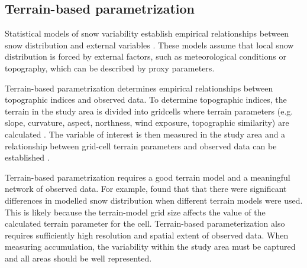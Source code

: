 \documentclass{sfuthesis}
\begin{document}
\subsection{Terrain-based parametrization}
Statistical models of snow variability establish empirical relationships between snow distribution and external variables \citep{Fowler2007}. These models assume that local snow distribution is forced by external factors, such as meteorological conditions or topography, which can be described by proxy parameters.

Terrain-based parametrization determines empirical relationships between topographic indices and observed data. To determine topographic indices, the terrain in the study area is divided into gridcells where terrain parameters (e.g. slope, curvature, aspect, northness, wind exposure, topographic similarity) are calculated \citep{Anderson2014,McGrath2015}. The variable of interest is then measured in the study area and a relationship between grid-cell terrain parameters and observed data can be established \citep[e.g.][]{Bloschl1991, Liston1998, Anderton2004,McGrath2015}. 

Terrain-based parametrization requires a good terrain model and a meaningful network of observed data. For example, \cite{Molotch2005} found that that there were significant differences in modelled snow distribution when different terrain models were used. This is likely because the terrain-model grid size affects the value of the calculated terrain parameter for the cell. Terrain-based parameterization also requires sufficiently high resolution and spatial extent of observed data. When measuring accumulation, the variability within the study area must be captured and all areas should be well represented. 
\end{document}
